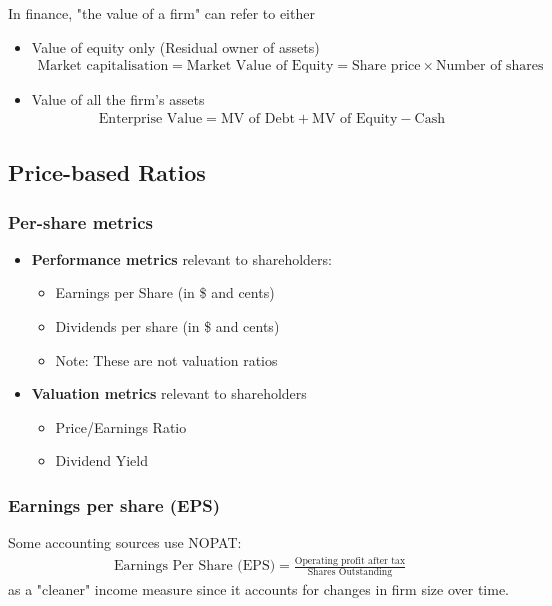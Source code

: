 \documentclass{article}
\begin{document}
			In finance, "the value of a firm" can refer to either
			\begin{itemize}
				\item Value of equity only (Residual owner of assets)
					\begin{align*}
						\text{Market capitalisation} = \text{Market Value of Equity} = \text{Share price} \times \text{Number of shares}
					\end{align*}
				\item Value of all the firm's assets
					\begin{align*}
						\text{Enterprise Value} = \text{MV of Debt} + \text{MV of Equity} - \text{Cash}
					\end{align*}
			\end{itemize}
	
	\subsection{Price-based Ratios}

		\subsubsection{Per-share metrics}
			
			\begin{itemize}
				\item \textbf{Performance metrics} relevant to shareholders:
					\begin{itemize}
						\item Earnings per Share (in \$ and cents)
						\item Dividends per share (in \$ and cents)
						\item \colorbox{pastel_red}{Note:} These are not valuation ratios
					\end{itemize}
				\item \textbf{Valuation metrics} relevant to shareholders
					\begin{itemize}
						\item Price/Earnings Ratio
						\item Dividend Yield
					\end{itemize}
			\end{itemize}

		\subsubsection{Earnings per share (EPS)}

			Some accounting sources use NOPAT:
			\begin{align*}
				\text{Earnings Per Share (EPS)} = \frac{\text{Operating profit after tax}}{\text{Shares Outstanding}}
			\end{align*}
			as a "cleaner" income measure since it accounts for changes in firm size over time.
\end{document}
